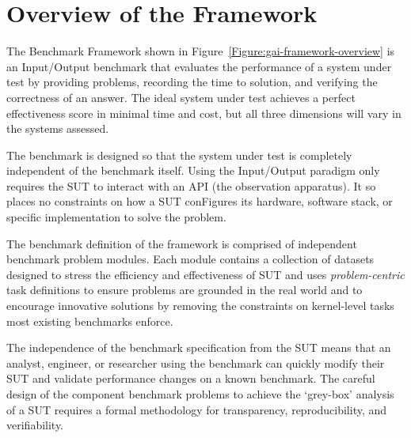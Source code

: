 \section{Overview of the \gai Framework}
\label{section:graph-based-ai-framework}



The \gai Benchmark Framework shown in Figure~\ref{Figure:gai-framework-overview} is an Input/Output benchmark that evaluates the performance of a system under test by providing problems, recording the time to solution, and verifying the correctness of an answer. 
The ideal system under test achieves a perfect effectiveness score in minimal time and cost, but all three dimensions will vary in the systems assessed. 

The benchmark is designed so that the system under test is completely independent of the benchmark itself. 
Using the Input/Output paradigm only requires the \ac{SUT} to interact with an \ac{API} (the observation apparatus). It so places no constraints on how a \ac{SUT} conFigures its hardware, software stack, or specific \gai implementation to solve the problem. 

The benchmark definition of the \gai framework is comprised of independent benchmark problem modules. 
Each module contains a collection of datasets designed to stress the efficiency and effectiveness of \ac{SUT} and uses \textit{problem-centric} task definitions to ensure problems are grounded in the real world and to encourage innovative solutions by removing the constraints on kernel-level tasks most existing benchmarks enforce. 

The independence of the benchmark specification from the \ac{SUT} means that an analyst, engineer, or researcher using the benchmark can quickly modify their \ac{SUT} and validate performance changes on a known benchmark. 
The careful design of the component benchmark problems to achieve the `grey-box' analysis of a \gai \ac{SUT} requires a formal methodology for transparency, reproducibility, and verifiability. 
